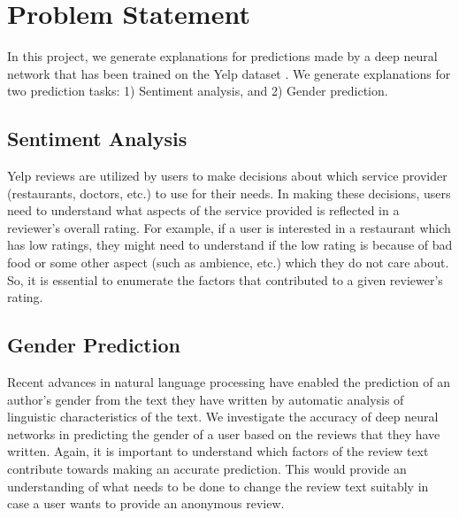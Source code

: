 \section{Problem Statement}

In this project, we generate explanations for predictions made by a deep neural network that has been trained on the Yelp dataset \cite{Yelp2017}. We generate explanations for two prediction tasks: 1) Sentiment analysis, and 2) Gender prediction.

\subsection{Sentiment Analysis}

Yelp reviews are utilized by users to make decisions about which service provider (restaurants, doctors, etc.) to use for their needs. In making these decisions, users need to understand what aspects of the service provided is reflected in a reviewer's overall rating. For example, if a user is interested in a restaurant which has low ratings, they might need to understand if the low rating is because of bad food or some other aspect (such as ambience, etc.) which they do not care about. So, it is essential to enumerate the factors that contributed to a given reviewer's rating.

\subsection{Gender Prediction}

Recent advances in natural language processing have enabled the prediction of an author's gender from the text they have written by automatic analysis of linguistic characteristics of the text. We investigate the accuracy of deep neural networks in predicting the gender of a user based on the reviews that they have written. Again, it is important to understand which factors of the review text contribute towards making an accurate prediction. This would provide an understanding of what needs to be done to change the review text suitably in case a user wants to provide an anonymous review.
